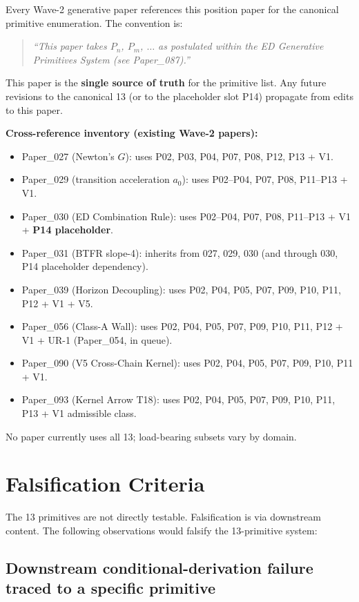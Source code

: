 \documentclass[11pt,a4paper]{article}
\begin{document}
Every Wave-2 generative paper references this position paper for the canonical primitive enumeration. The convention is:

\begin{quote}
\emph{``This paper takes $P_n$, $P_m$, $\ldots$ as postulated within the ED Generative Primitives System (see Paper\_087).''}
\end{quote}

This paper is the \textbf{single source of truth} for the primitive list. Any future revisions to the canonical 13 (or to the placeholder slot P14) propagate from edits to this paper.

\textbf{Cross-reference inventory (existing Wave-2 papers):}

\begin{itemize}[noitemsep]
\item Paper\_027 (Newton's $G$): uses P02, P03, P04, P07, P08, P12, P13 + V1.
\item Paper\_029 (transition acceleration $a_0$): uses P02--P04, P07, P08, P11--P13 + V1.
\item Paper\_030 (ED Combination Rule): uses P02--P04, P07, P08, P11--P13 + V1 + \textbf{P14 placeholder}.
\item Paper\_031 (BTFR slope-4): inherits from 027, 029, 030 (and through 030, P14 placeholder dependency).
\item Paper\_039 (Horizon Decoupling): uses P02, P04, P05, P07, P09, P10, P11, P12 + V1 + V5.
\item Paper\_056 (Class-A Wall): uses P02, P04, P05, P07, P09, P10, P11, P12 + V1 + UR-1 (Paper\_054, in queue).
\item Paper\_090 (V5 Cross-Chain Kernel): uses P02, P04, P05, P07, P09, P10, P11 + V1.
\item Paper\_093 (Kernel Arrow T18): uses P02, P04, P05, P07, P09, P10, P11, P13 + V1 admissible class.
\end{itemize}

No paper currently uses all 13; load-bearing subsets vary by domain.

\section{Falsification Criteria}

The 13 primitives are not directly testable. Falsification is via downstream content. The following observations would falsify the 13-primitive system:

\subsection{Downstream conditional-derivation failure traced to a specific primitive}
\end{document}
